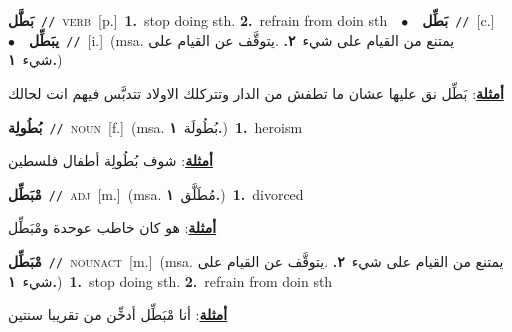 \documentclass[10pt,a4paper,twoside]{article} %
\begin{document}
\begin{multicols}{2}
{\setlength\topsep{0pt}\textbf{\foreignlanguage{arabic}{بَطَّل}}\ {\color{gray}\texttt{//}\color{black}}\ \textsc{verb}\ [p.]\ \textbf{1.}~stop doing sth.  \textbf{2.}~refrain from doin sth\ \ $\bullet$\ \ \setlength\topsep{0pt}\textbf{\foreignlanguage{arabic}{بَطِّل}}\ {\color{gray}\texttt{//}\color{black}}\ [c.]\ \ $\bullet$\ \ \setlength\topsep{0pt}\textbf{\foreignlanguage{arabic}{يبَطِّل}}\ {\color{gray}\texttt{//}\color{black}}\ [i.]\ \color{gray}(msa. \foreignlanguage{arabic}{يمتنع من القيام على شيء}~\foreignlanguage{arabic}{\textbf{٢.}}  .\foreignlanguage{arabic}{يتوقَّف عن القيام على شيء}~\foreignlanguage{arabic}{\textbf{١.}})\color{black}\  \begin{flushright}\color{gray}\foreignlanguage{arabic}{\textbf{\underline{\foreignlanguage{arabic}{أمثلة}}}: بَطِّل نق عليها عشان ما تطفش من الدار وتتركلك الاولاد تتدبَّس فيهم انت لحالك}\end{flushright}\color{black}} \vspace{2mm}

{\setlength\topsep{0pt}\textbf{\foreignlanguage{arabic}{بُطُولِة}}\ {\color{gray}\texttt{//}\color{black}}\ \textsc{noun}\ [f.]\ \color{gray}(msa. \foreignlanguage{arabic}{بُطُولَة}~\foreignlanguage{arabic}{\textbf{١.}})\color{black}\ \textbf{1.}~heroism\  \begin{flushright}\color{gray}\foreignlanguage{arabic}{\textbf{\underline{\foreignlanguage{arabic}{أمثلة}}}: شوف بُطُولِة أطفال فلسطين}\end{flushright}\color{black}} \vspace{2mm}

{\setlength\topsep{0pt}\textbf{\foreignlanguage{arabic}{مْبَطِّل}}\ {\color{gray}\texttt{//}\color{black}}\ \textsc{adj}\ [m.]\ \color{gray}(msa. \foreignlanguage{arabic}{مُطَلَّق}~\foreignlanguage{arabic}{\textbf{١.}})\color{black}\ \textbf{1.}~divorced\  \begin{flushright}\color{gray}\foreignlanguage{arabic}{\textbf{\underline{\foreignlanguage{arabic}{أمثلة}}}: هو كان خاطب عوحدة ومْبَطِّل}\end{flushright}\color{black}} \vspace{2mm}

{\setlength\topsep{0pt}\textbf{\foreignlanguage{arabic}{مْبَطِّل}}\ {\color{gray}\texttt{//}\color{black}}\ \textsc{noun\textunderscore act}\ [m.]\ \color{gray}(msa. \foreignlanguage{arabic}{يمتنع من القيام على شيء}~\foreignlanguage{arabic}{\textbf{٢.}}  .\foreignlanguage{arabic}{يتوقَّف عن القيام على شيء}~\foreignlanguage{arabic}{\textbf{١.}})\color{black}\ \textbf{1.}~stop doing sth.  \textbf{2.}~refrain from doin sth\  \begin{flushright}\color{gray}\foreignlanguage{arabic}{\textbf{\underline{\foreignlanguage{arabic}{أمثلة}}}: أنا مْبَطِّل أدخِّن من تقريبا سنتين}\end{flushright}\color{black}} \vspace{2mm}


\end{multicols}
\end{document}
